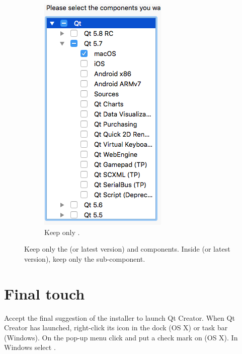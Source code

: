 \begin{figure} [h]
\begin{subfigure}{.333\textwidth}
  \includegraphics[width=.9\textwidth]{graphics/qt-setup-osx-3.png}
  \caption{Keep only .}
\end{subfigure}%
\caption{Keep only the  (or latest version) and  components. Inside  (or latest version), keep only the  sub-component.}
\label{fig:qt-setup-osx}
\end{figure}

\section{Final touch}
Accept the final suggestion of the installer to launch Qt Creator. When Qt Creator has launched, right-click its icon in the dock (OS X) or task bar (Windows). On the pop-up menu click  and put a check mark on  (OS X). In Windows select . 

